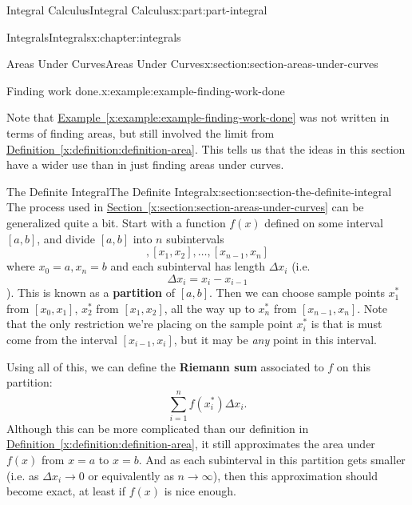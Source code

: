 \documentclass[twoside,10pt,]{tufte-book}
\newcommand{\xreffont}{\relax}
\newcommand{\terminology}[1]{\textbf{#1}}
\numberwithin{equation}{part}
\begin{document}
\begin{partptx}{Integral Calculus}{}{Integral Calculus}{}{}{x:part:part-integral}
\begin{chapterptx}{Integrals}{}{Integrals}{}{}{x:chapter:integrals}
\begin{sectionptx}{Areas Under Curves}{}{Areas Under Curves}{}{}{x:section:section-areas-under-curves}
\begin{example}{Finding work done.}{x:example:example-finding-work-done}
\begin{equation*}
\end{equation*}
%
\end{example}
Note that \hyperref[x:example:example-finding-work-done]{Example~{\xreffont\ref{x:example:example-finding-work-done}}} was not written in terms of finding areas, but still involved the limit from \hyperref[x:definition:definition-area]{Definition~{\xreffont\ref{x:definition:definition-area}}}. This tells us that the ideas in this section have a wider use than in just finding areas under curves.%
\end{sectionptx}
%
%
\typeout{************************************************}
\typeout{************************************************}
%
\begin{sectionptx}{The Definite Integral}{}{The Definite Integral}{}{}{x:section:section-the-definite-integral}
The process used in \hyperref[x:section:section-areas-under-curves]{Section~{\xreffont\ref{x:section:section-areas-under-curves}}} can be generalized quite a bit. Start with a function \(f(x)\) defined on some interval \([a,b]\), and divide \([a,b]\) into \(n\) subintervals%
\begin{equation*}
[x_{0},x_{1}], [x_{1},x_{2}],\ldots,[x_{n-1},x_{n}]
\end{equation*}
where \(x_{0} = a, x_{n} = b\) and each subinterval has length \(\Delta x_{i}\) (i.e.%
\begin{equation*}
\Delta x_{i} = x_{i} - x_{i-1}
\end{equation*}
). This is known as a \terminology{partition} of \([a,b]\). Then we can choose sample points \(x_{1}^{*}\) from \([x_{0},x_{1}]\), \(x_{2}^{*}\) from \([x_{1},x_{2}]\), all the way up to \(x_{n}^{*}\) from \([x_{n-1},x_{n}]\). Note that the only restriction we're placing on the sample point \(x_{i}^{*}\) is that is must come from the interval \([x_{i-1},x_{i}]\), but it may be \emph{any} point in this interval.%
\par
Using all of this, we can define the \terminology{Riemann sum} associated to \(f\) on this partition:%
\begin{equation*}
\sum_{i=1}^{n}f(x_{i}^{*})\Delta x_{i}.
\end{equation*}
Although this can be more complicated than our definition in \hyperref[x:definition:definition-area]{Definition~{\xreffont\ref{x:definition:definition-area}}}, it still approximates the area under \(f(x)\) from \(x=a\) to \(x=b\). And as each subinterval in this partition gets smaller (i.e. as \(\Delta x_{i}\to0\) or equivalently as \(n\to\infty\)), then this approximation should become exact, at least if \(f(x)\) is nice enough.%

\end{sectionptx}
\end{chapterptx}
\end{partptx}
\end{document}

